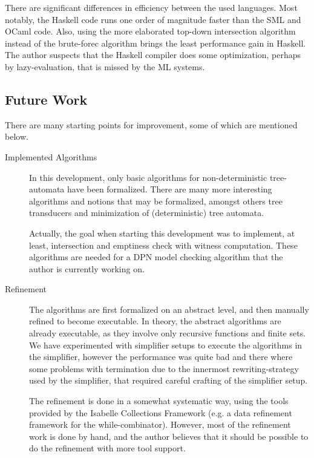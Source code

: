   There are significant differences in efficiency between the used languages. Most notably, the Haskell code runs one order of magnitude faster than the SML and OCaml code. Also, using the more elaborated top-down intersection algorithm instead of the brute-forec algorithm brings the least performance gain in Haskell.
  The author suspects that the Haskell compiler does some optimization, perhaps by lazy-evaluation, that is missed by the ML systems.

\subsection{Future Work}
There are many starting points for improvement, some of which are mentioned below.

\begin{description}
  \item[Implemented Algorithms]
    In this development, only basic algorithms for non-deterministic tree-automata have been formalized. There are many more interesting algorithms and notions that may be formalized, amongst others tree transducers and minimization of (deterministic) tree automata.
    
    Actually, the goal when starting this development was to implement, at 
    least, intersection and emptiness check with witness computation. These algorithms are needed for a DPN\cite{BMT05} model checking algorithm\cite{L09_kps} that the author is currently working on.

  \item[Refinement]
    The algorithms are first formalized on an abstract level, and then manually refined to become executable.
    In theory, the abstract algorithms are already executable, as they involve only recursive functions and finite sets.
    We have experimented with simplifier setups to execute the algorithms in the simplifier, however the performance was quite bad and there where some problems with 
    termination due to the innermost rewriting-strategy used by the simplifier, that required careful crafting of the simplifier setup.

    The refinement is done in a somewhat systematic way, using the tools provided by the Isabelle Collections Framework (e.g. a data refinement framework for the while-combinator).
    However, most of the refinement work is done by hand, and the author believes that it should be possible to do the refinement with more tool support.

\end{description}

